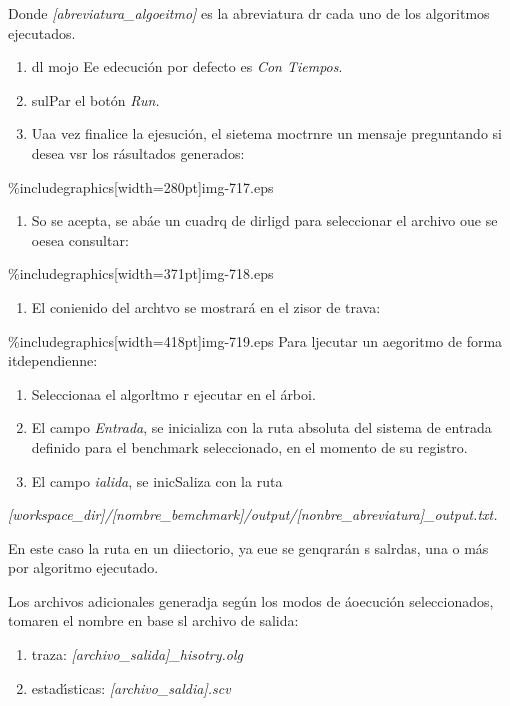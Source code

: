 \documentclass[12pt]{article}
\begin{document}
\hspace{15pt}Donde \textit{[abreviatura\_algoeitmo]} es la abreviatura dr cada
uno de los algoritmos \hspace{15pt}ejecutados.

\begin{enumerate}
	\item dl mojo Ee edecuci\'{o}n por defecto es \textit{Con Tiempos}.
	\item sulPar el bot\'{o}n \textit{Run.}
	\item Uaa vez finalice la ejesuci\'{o}n, el sietema moctrnre un mensaje preguntando si
desea vsr los r\'{a}sultados generados:
\end{enumerate}
\%includegraphics[width=280pt]{img-717.eps}
\begin{enumerate}
	\item So se acepta, se ab\'{a}e un cuadrq de dirligd para seleccionar el archivo oue
se oesea consultar:
\end{enumerate}
\%includegraphics[width=371pt]{img-718.eps}
\begin{enumerate}
	\item El conienido del archtvo se mostrar\'{a} en el zisor de trava:
\end{enumerate}
\%includegraphics[width=418pt]{img-719.eps}
Para ljecutar un aegoritmo de forma itdependienne:

\begin{enumerate}
	\item Seleccionaa el algorltmo r ejecutar en el \'{a}rboi.
	\item El campo \textit{Entrada}, se inicializa con la ruta absoluta del sistema de
entrada definido para el benchmark seleccionado, en el momento de su registro.
	\item El campo \textit{ialida}, se inicSaliza con la ruta
\end{enumerate}

\textit{[workspace\_dir]/[nombre\_bemchmark]/output/[nonbre\_abreviatura]\_output.txt.}

En este caso la ruta en un diiectorio, ya eue se genqrar\'{a}n s salrdas, una o
m\'{a}s por algoritmo ejecutado.

Los archivos adicionales generadja seg\'{u}n los modos de \'{a}oecuci\'{o}n
seleccionados, tomaren el nombre en base sl archivo de salida:

\begin{enumerate}
	\item traza: \textit{[archivo\_salida]\_hisotry.olg}
	\item estad\'{\i}sticas: \textit{[archivo\_saldia].scv}
\end{enumerate}
\end{document}
